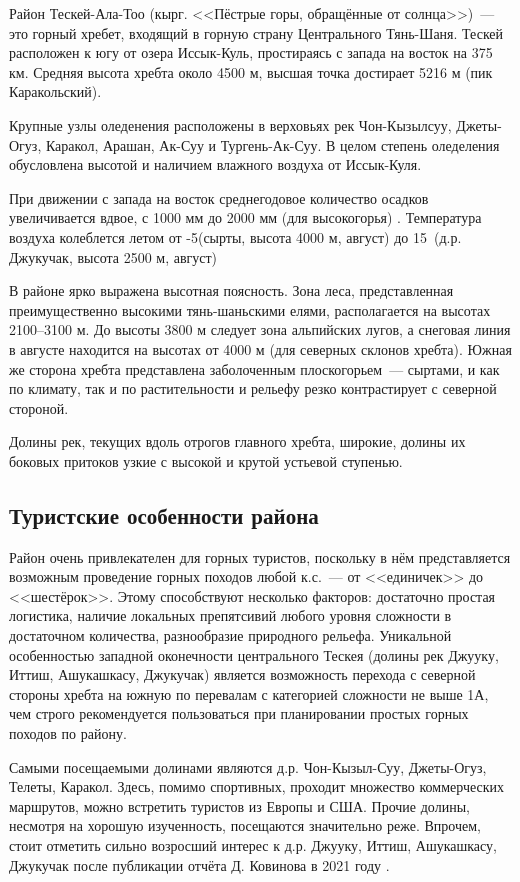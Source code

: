 Район Тескей-Ала-Тоо (кырг. <<Пёстрые горы, обращённые от солнца>>)~--- это горный хребет, входящий в горную страну Центрального Тянь-Шаня. Тескей расположен к югу от озера Иссык-Куль, простираясь с запада на восток на 375 км. Средняя высота хребта около 4500 м, высшая точка достирает 5216 м (пик Каракольский).

Крупные узлы оледенения расположены в верховьях рек Чон-Кызылсуу, Джеты-Огуз, Каракол, Арашан, Ак-Суу и Тургень-Ак-Суу. В целом степень оледеления обусловлена высотой и наличием влажного воздуха от Иссык-Куля.

При движении с запада на восток среднегодовое количество осадков увеличивается вдвое, с 1000 мм до 2000 мм (для высокогорья) \cite{rodina2012}. Температура воздуха колеблется летом от -5\degree (сырты, высота 4000 м, август) до 15\degree~(д.р. Джукучак, высота 2500 м, август)

В районе ярко выражена высотная поясность. Зона леса, представленная преимущественно высокими тянь-шаньскими елями, располагается на высотах 2100--3100 м. До высоты 3800 м следует зона альпийских лугов, а снеговая линия в августе находится на высотах от 4000 м (для северных склонов хребта). Южная же сторона хребта представлена заболоченным плоскогорьем~--- сыртами, и как по климату, так и по растительности и рельефу резко контрастирует с северной стороной.

Долины рек, текущих вдоль отрогов главного хребта, широкие, долины их боковых притоков узкие с высокой и крутой устьевой ступенью.

\subsection{Туристские особенности района}
Район очень привлекателен для горных туристов, поскольку в нём представляется возможным проведение горных походов любой к.с.~--- от <<единичек>> до <<шестёрок>>. Этому способствуют несколько факторов: достаточно простая логистика, наличие локальных препятсивий любого уровня сложности в достаточном количества, разнообразие природного рельефа. Уникальной особенностью западной оконечности центрального Тескея (долины рек Джууку, Иттиш, Ашукашкасу, Джукучак) является возможность перехода с северной стороны хребта на южную по перевалам с категорией сложности не выше 1А, чем строго рекомендуется пользоваться при планировании простых горных походов по району.

Самыми посещаемыми долинами являются д.р. Чон-Кызыл-Суу, Джеты-Огуз, Телеты, Каракол. Здесь, помимо спортивных, проходит множество коммерческих маршрутов, можно встретить туристов из Европы и США. Прочие долины, несмотря на хорошую изученность, посещаются значительно реже. Впрочем, стоит отметить сильно возросший интерес к д.р. Джууку, Иттиш, Ашукашкасу, Джукучак после публикации отчёта Д. Ковинова в 2021 году \cite{kovinov2021}.

